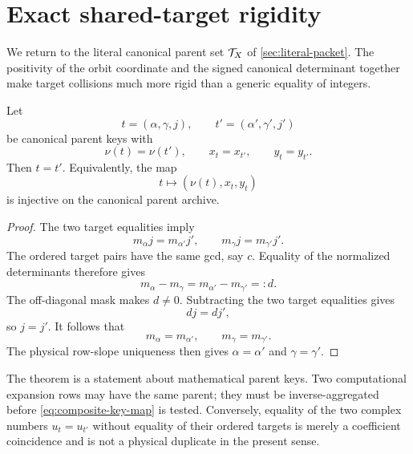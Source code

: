 \section{Exact shared-target rigidity}
\label{sec:shared-target-rigidity}

We return to the literal canonical parent set
\(\mathcal T_X\) of \cref{sec:literal-packet}.  The positivity of the orbit
coordinate and the signed canonical determinant together make target
collisions much more rigid than a generic equality of integers.

\begin{theorem}
\label{thm:composite-uniqueness}
Let
\[
 t=(\alpha,\gamma,j),\qquad
 t'=(\alpha',\gamma',j')
\]
be canonical parent keys with
\begin{equation}
 \nu(t)=\nu(t'),\qquad
 x_t=x_{t'},\qquad
 y_t=y_{t'}.
\label{eq:ordered-collision-hyp}
\end{equation}
Then \(t=t'\).  Equivalently, the map
\begin{equation}
 t\longmapsto(\nu(t),x_t,y_t)
\label{eq:composite-key-map}
\end{equation}
is injective on the canonical parent archive.
\end{theorem}

\begin{proof}
The two target equalities imply
\[
 m_\alpha j=m_{\alpha'}j',
 \qquad
 m_\gamma j=m_{\gamma'}j'.
\]
The ordered target pairs have the same gcd, say \(c\).  Equality of
the normalized determinants therefore gives
\[
 m_\alpha-m_\gamma
 =
 m_{\alpha'}-m_{\gamma'}=:d.
\]
The off-diagonal mask makes \(d\ne0\).  Subtracting the two target
equalities gives
\[
 dj=dj',
\]
so \(j=j'\).  It follows that
\[
 m_\alpha=m_{\alpha'},\qquad
 m_\gamma=m_{\gamma'}.
\]
The physical row-slope uniqueness then gives
\(\alpha=\alpha'\) and \(\gamma=\gamma'\).
\end{proof}

\begin{remark}
\label{rem:uniqueness-premise}
The theorem is a statement about mathematical parent keys.  Two
computational expansion rows may have the same parent; they must be
inverse-aggregated before \eqref{eq:composite-key-map} is tested.
Conversely, equality of the two complex numbers \(u_t=u_{t'}\)
without equality of their ordered targets is merely a coefficient
coincidence and is not a physical duplicate in the present sense.
\end{remark}

